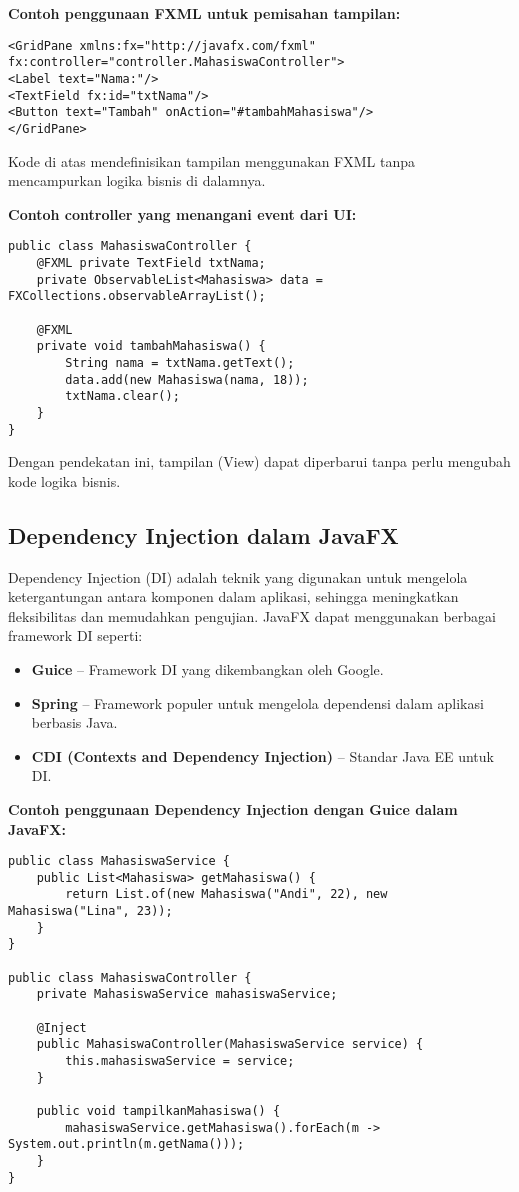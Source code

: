 \textbf{Contoh penggunaan FXML untuk pemisahan tampilan:}

\begin{lstlisting}[style=XmlStyle, caption=Contoh file FXML]
<GridPane xmlns:fx="http://javafx.com/fxml" fx:controller="controller.MahasiswaController">
<Label text="Nama:"/>
<TextField fx:id="txtNama"/>
<Button text="Tambah" onAction="#tambahMahasiswa"/>
</GridPane>
\end{lstlisting}

Kode di atas mendefinisikan tampilan menggunakan FXML tanpa mencampurkan logika bisnis di dalamnya.

\textbf{Contoh controller yang menangani event dari UI:}

\begin{lstlisting}[style=JavaStyle, caption=Menangani aksi tombol dalam JavaFX]
public class MahasiswaController {
	@FXML private TextField txtNama;
	private ObservableList<Mahasiswa> data = FXCollections.observableArrayList();
	
	@FXML
	private void tambahMahasiswa() {
		String nama = txtNama.getText();
		data.add(new Mahasiswa(nama, 18));
		txtNama.clear();
	}
}
\end{lstlisting}

Dengan pendekatan ini, tampilan (View) dapat diperbarui tanpa perlu mengubah kode logika bisnis.

\subsection{Dependency Injection dalam JavaFX}

Dependency Injection (DI) adalah teknik yang digunakan untuk mengelola ketergantungan antara komponen dalam aplikasi, sehingga meningkatkan fleksibilitas dan memudahkan pengujian. JavaFX dapat menggunakan berbagai framework DI seperti:
\begin{itemize}
\item \textbf{Guice} – Framework DI yang dikembangkan oleh Google.
\item \textbf{Spring} – Framework populer untuk mengelola dependensi dalam aplikasi berbasis Java.
\item \textbf{CDI (Contexts and Dependency Injection)} – Standar Java EE untuk DI.
\end{itemize}

\textbf{Contoh penggunaan Dependency Injection dengan Guice dalam JavaFX:}

\begin{lstlisting}[style=JavaStyle, caption=Contoh implementasi Dependency Injection dengan Guice]
public class MahasiswaService {
	public List<Mahasiswa> getMahasiswa() {
		return List.of(new Mahasiswa("Andi", 22), new Mahasiswa("Lina", 23));
	}
}

public class MahasiswaController {
	private MahasiswaService mahasiswaService;
	
	@Inject
	public MahasiswaController(MahasiswaService service) {
		this.mahasiswaService = service;
	}
	
	public void tampilkanMahasiswa() {
		mahasiswaService.getMahasiswa().forEach(m -> System.out.println(m.getNama()));
	}
}
\end{lstlisting}

